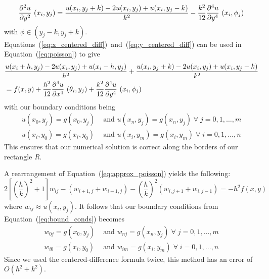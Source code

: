 \documentclass[12pt, titlepage]{article}
\begin{document}
    \begin{equation}\label{eq:y_centered_diff}
        \pdv[2]{u}{y}~(x_i, y_j) = \frac{u(x_i, y_j + k) - 2u(x_i, y_j) + u(x_i, y_j-k)}{k^2} - \frac{k^2}{12}\pdv[4]{u}{y}~(x_i, \phi_j)
    \end{equation}
    with $\phi \in (y_j-k,y_j+k)$. Equations~(\ref{eq:x_centered_diff})~and~(\ref{eq:y_centered_diff}) can be used in Equation~(\ref{eq:poisson}) to give
    \begin{equation}\label{eq:approx_poisson}
        \begin{split}
            &\frac{u(x_i + h, y_j) - 2u(x_i, y_j) + u(x_i - h, y_j)}{h^2} + \frac{u(x_i, y_j + k) - 2u(x_i, y_j) + u(x_i, y_j-k)}{k^2}\\
            &= f(x,y) + \frac{h^2}{12}\pdv[4]{u}{x}~(\theta_i, y_j) + \frac{k^2}{12}\pdv[4]{u}{y}~(x_i, \phi_j)
        \end{split}
    \end{equation}
    with our boundary conditions being
    \begin{equation}\label{eq:bound_conds}
        \begin{split}
            u(x_0, y_j) = g(x_0, y_j)&\text{ and }u(x_n, y_j) = g(x_n, y_j) \;\forall\;j=0,1,\dots,m\\
            u(x_i, y_0) = g(x_i, y_0)&\text{ and }u(x_i, y_m) = g(x_i, y_m) \;\forall\;i=0,1,\dots,n
        \end{split}
    \end{equation}
    This ensures that our numerical solution is correct along the borders of our rectangle \textit{R}.

    A rearrangement of Equation~(\ref{eq:approx_poisson}) yields the following:
    \begin{equation}\label{eq:pde_finite_diff}
        2\left[\left(\frac{h}{k}\right)^2 + 1\right]w_{ij} - (w_{i+1,j} + w_{i-1,j})-\left(\frac{h}{k}\right)^2 (w_{i,j+1}+w_{i,j-1}) = -h^2f(x,y)
    \end{equation}
    where $w_{ij}\approx u(x_i, y_j)$. It follows that our boundary conditions from Equation~(\ref{eq:bound_conds}) becomes
    \begin{align*}
        w_{0j} = g(x_0, y_j)&\text{ and }w_{nj} = g(x_n, y_j) \;\forall\;j=0,1,\dots,m\\
        w_{i0} = g(x_i, y_0)&\text{ and }w_{im} = g(x_i, y_m) \;\forall\;i=0,1,\dots,n
    \end{align*}
    Since we used the centered-difference formula twice, this method has an error of $O(h^2 + k^2)$.
\end{document}
